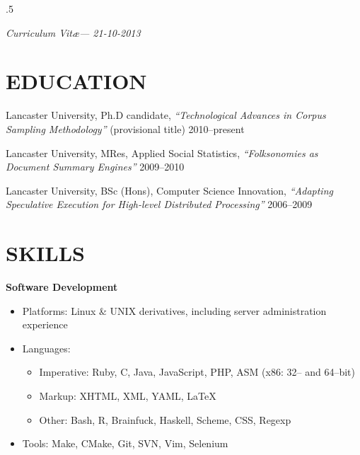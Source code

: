 \documentclass{res}
\begin{document}
 
\thispagestyle{empty} %
\address{\texttt{http://stephenwattam.com/}}


\begin{resume}
\vspace{0.2in}
\moveleft.5\sectionwidth\centerline{\it Curriculum Vit\ae --- 21-10-2013}  

\section{EDUCATION}
\vspace{0.1in} 
 
    Lancaster University, Ph.D candidate,
    \textit{``Technological Advances in Corpus Sampling Methodology''} (provisional title)
    2010--present

    Lancaster University, MRes,
    Applied Social Statistics, 
    \textit{``Folksonomies as Document Summary Engines''}
    2009--2010

    Lancaster University, BSc (Hons),
    Computer Science Innovation, 
    \textit{``Adapting Speculative Execution for High-level Distributed Processing''}
    2006--2009

 
\section{SKILLS} 
\vspace{0.1in}

   {\bf Software Development} 
        \begin{itemize}
            \item[] Platforms: Linux \& UNIX derivatives, including server administration experience
            \item[] Languages:
                \begin{itemize}
                    \item Imperative: Ruby, C, Java, JavaScript, PHP, ASM (x86: 32-- and 64--bit)
                    \item Markup: XHTML, XML, YAML, \LaTeX
                    \item Other: Bash, R, Brainfuck, Haskell, Scheme, CSS, Regexp
                \end{itemize}
            \item[] Tools: Make, CMake, Git, SVN, Vim, Selenium
        \end{itemize}


\end{resume}
\end{document}
